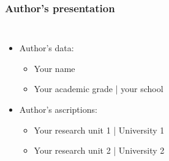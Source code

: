
\begin{frame}
\frametitle{Author's presentation}
\begin{columns}[c]
\column{2.5in}

\begin{itemize}
	\item Author's data:
	\begin{itemize}
		\item Your name
		\item Your academic grade | your school
	\end{itemize}
	\item Author's ascriptions:
	\begin{itemize}
		\item Your research unit 1 | University 1
		\item Your research unit 2 | University 2
	\end{itemize}
\end{itemize}

\column{1.5in}
\end{columns}
\end{frame}
